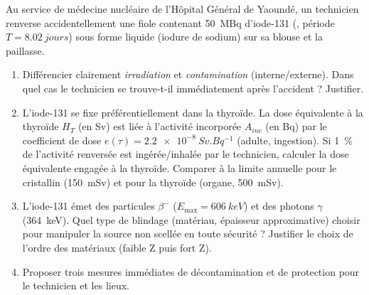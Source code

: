 \documentclass[11pt]{article}
\begin{document}
\begin{exercice}
Au service de médecine nucléaire de l'Hôpital Général de Yaoundé, un technicien renverse accidentellement une fiole contenant \SI{50}{MBq} d'iode-131 (, période $T = \SI{8,02}{jours}$) sous forme liquide (iodure de sodium) sur sa blouse et la paillasse.
\begin{enumerate}
    \item Différencier clairement \textit{irradiation} et \textit{contamination} (interne/externe). Dans quel cas le technicien se trouve-t-il immédiatement après l'accident ? Justifier.
    \item L'iode-131 se fixe préférentiellement dans la thyroïde. La dose équivalente à la thyroïde $H_T$ (en Sv) est liée à l'activité incorporée $A_{inc}$ (en Bq) par le coefficient de dose $e(\tau) = \SI{2,2e-8}{Sv.Bq^{-1}}$ (adulte, ingestion).
        Si \SI{1}{\%} de l'activité renversée est ingérée/inhalée par le technicien, calculer la dose équivalente engagée à la thyroïde. Comparer à la limite annuelle pour le cristallin (\SI{150}{mSv}) et pour la thyroïde (organe, \SI{500}{mSv}).
    \item L'iode-131 émet des particules $\beta^-$ ($E_{\max} = \SI{606}{keV}$) et des photons $\gamma$ (\SI{364}{keV}). Quel type de blindage (matériau, épaisseur approximative) choisir pour manipuler la source non scellée en toute sécurité ? Justifier le choix de l'ordre des matériaux (faible Z puis fort Z).
    \item Proposer trois mesures immédiates de décontamination et de protection pour le technicien et les lieux.
\end{enumerate}
\end{exercice}
\end{document}

